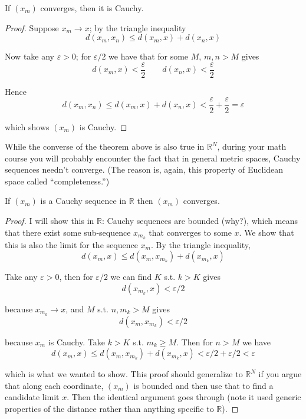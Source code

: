 \documentclass{article}
\begin{document}
\begin{theorem}
  If $(x_m)$ converges, then it is Cauchy.
\end{theorem}

\begin{proof}
  Suppose $x_m \to x$; by the triangle inequality
  \[
    d(x_m, x_n) \le d(x_m, x) + d(x_n, x)
  \]

  Now take any $\varepsilon > 0$; for $\varepsilon / 2$ we have that for some $M$, $m, n > M$ gives
  \[
    d(x_m, x) < \dfrac{\varepsilon}{2}
    \quad\quad
    d(x_n, x) < \dfrac{\varepsilon}{2}
  \]

  Hence
  \[
    d(x_m, x_n) \le d(x_m, x) + d(x_n, x) < \dfrac{\varepsilon}{2} +  \dfrac{\varepsilon}{2} = \varepsilon
  \]

  which shows $(x_m)$ is Cauchy.
\end{proof}

While the converse of the theorem above is also true in $\mathbb{R}^N$, during your math course you will probably encounter the fact that in general metric spaces, Cauchy sequences needn't converge. (The reason is, again, this property of Euclidean space called ``completeness.'')
\begin{theorem}
  If $(x_m)$ is a Cauchy sequence in $\mathbb{R}$ then $(x_m)$ converges.
\end{theorem}

\begin{proof}
  I will show this in $\mathbb{R}$: Cauchy sequences are bounded (why?), which means that there exist some sub-sequence $x_{m_k}$ that converges to some $x$. We show that this is also the limit for the sequence $x_m$. By the triangle inequality,
  \[
    d(x_m, x) \le d(x_m, x_{m_k}) + d(x_{m_k}, x)
  \]

  Take any $\varepsilon > 0$, then for $\varepsilon / 2$ we can find $K$ s.t. $k > K$ gives
  \[
    d(x_{m_k}, x) < \varepsilon / 2
  \]

  because $x_{m_k} \to x$, and $M$ s.t. $n, m_k > M$ gives
  \[
    d(x_m, x_{m_k}) < \varepsilon / 2
  \]

  because $x_m$ is Cauchy. Take $k > K$ s.t. $m_k \ge M$. Then for $n > M$ we have
  \[
    d(x_m, x) \le d(x_m, x_{m_k}) + d(x_{m_k}, x) < \varepsilon / 2 + \varepsilon / 2 < \varepsilon
  \]

  which is what we wanted to show. This proof should generalize to $\mathbb{R}^N$ if you argue that along each coordinate, $(x_m)$ is bounded and then use that to find a candidate limit $x$. Then the identical argument goes through (note it used generic properties of the distance rather than anything specific to $\mathbb{R}$).
\end{proof}
\end{document}
